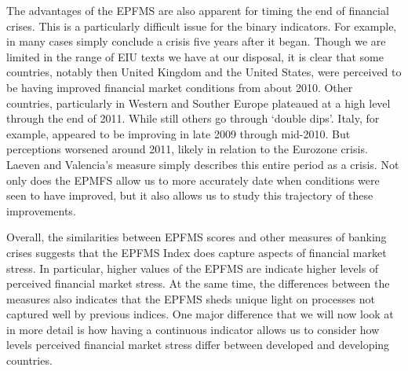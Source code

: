 \documentclass[]{article}
\begin{document}
The advantages of the EPFMS are also apparent for timing the end of financial crises. This is a particularly difficult issue for the binary indicators. For example, in many cases \cite{laeven2013} simply conclude a crisis five years after it began. Though we are limited in the range of EIU texts we have at our disposal, it is clear that some countries, notably then United Kingdom and the United States, were perceived to be having improved financial market conditions from about 2010. Other countries, particularly in Western and Souther Europe plateaued at a high level through the end of 2011. While still others go through `double dips'. Italy, for example, appeared to be improving in late 2009 through mid-2010. But perceptions worsened around 2011, likely in relation to the Eurozone crisis. Laeven and Valencia's measure simply describes this entire period as a crisis. Not only does the EPMFS allow us to more accurately date when conditions were seen to have improved, but it also allows us to study this trajectory of these improvements.

Overall, the similarities between EPFMS scores and other measures of
banking crises suggests that the EPFMS Index does capture aspects of
financial market stress. In particular, higher values of the EPFMS are
indicate higher levels of perceived financial market stress. At the same
time, the differences between the measures also indicates that the EPFMS
sheds unique light on processes not captured well by previous indices.
One major difference that we will now look at in more detail is how
having a continuous indicator allows us to consider how levels perceived
financial market stress differ between developed and developing
countries.
\end{document}
